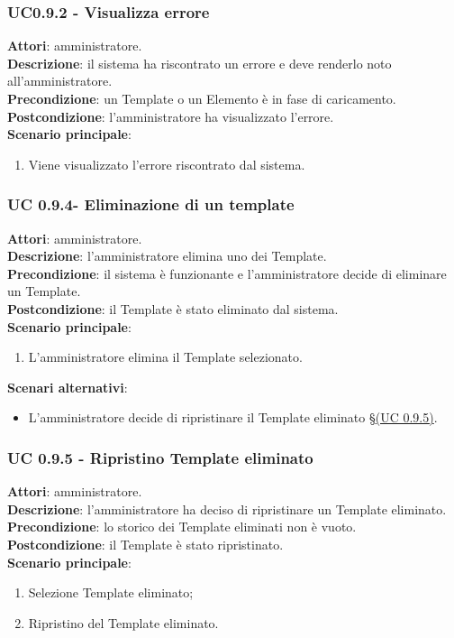 \subsubsection{UC0.9.2 - Visualizza errore}{
	\label{uc0.9.2}
	\textbf{Attori}: amministratore. \\
	\textbf{Descrizione}: il sistema ha riscontrato un errore e deve renderlo noto all'amministratore. \\
	\textbf{Precondizione}: un Template o un Elemento è in fase di caricamento.	\\
	\textbf{Postcondizione}: l'amministratore ha visualizzato l'errore.	\\
	\textbf{Scenario principale}:
	\begin{enumerate}
		\item Viene visualizzato l'errore riscontrato dal sistema.
	\end{enumerate}
	}
\subsubsection{UC 0.9.4- Eliminazione di un template}{
	\label{uc0.9.4}
	\textbf{Attori}: amministratore. \\
	\textbf{Descrizione}: l'amministratore elimina uno dei Template. \\
	\textbf{Precondizione}: il sistema è funzionante e l'amministratore decide di eliminare un Template.	\\
	\textbf{Postcondizione}: il Template è stato eliminato dal sistema.	\\
	\textbf{Scenario principale}:
	\begin{enumerate}
		\item L’amministratore elimina il Template selezionato.
	\end{enumerate}
	\textbf{Scenari alternativi}:
	\begin{itemize}
		\item L'amministratore decide di ripristinare il Template eliminato \S\hyperref[uc0.9.5]{(UC 0.9.5)}.
	\end{itemize}
	}
\subsubsection{UC 0.9.5 - Ripristino Template eliminato}{
	\label{uc0.9.5}
	\textbf{Attori}: amministratore. \\
	\textbf{Descrizione}: l'amministratore ha deciso di ripristinare un Template eliminato. \\
	\textbf{Precondizione}: lo storico dei Template eliminati non è vuoto.	\\
	\textbf{Postcondizione}: il Template è stato ripristinato.	\\
	\textbf{Scenario principale}:
	\begin{enumerate}
		\item Selezione Template eliminato; 
		\item Ripristino del Template eliminato.
	\end{enumerate}
	}